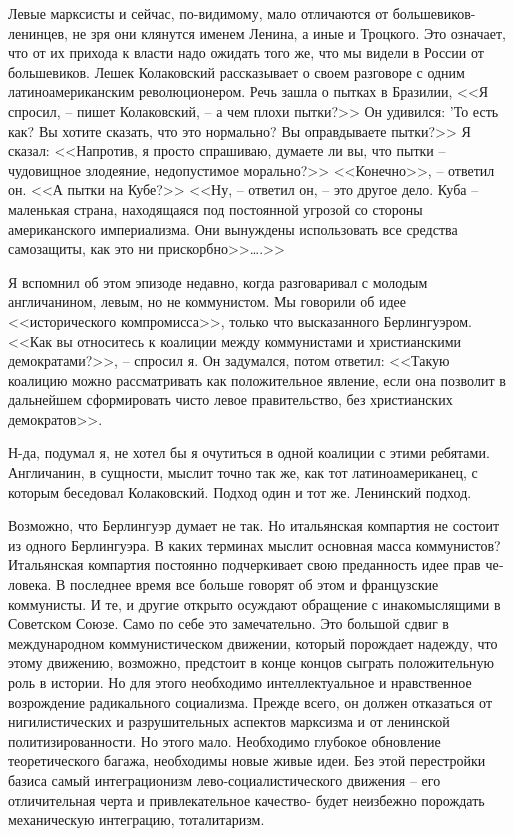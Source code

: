 \documentclass{book}
\begin{document}
Левые марксисты и сейчас, по-видимому, мало отличаются от большевиков-ленинцев, не зря они клянутся именем Ленина, а иные и Троцкого. Это означает, что от их прихода к власти надо ожидать того же, что мы видели в России от большевиков. Лешек Колаковский рассказывает о своем разговоре с одним латиноамериканским революционером. Речь зашла о пытках в Бразилии, <<Я спросил, -- пишет Колаковский, -- а чем плохи пытки?>> Он удивился: 'То есть как? Вы хотите сказать, что это нормально? Вы оправдываете пытки?>> Я сказал: <<Напротив, я просто спрашиваю, думаете ли вы, что пытки -- чудовищное зло­деяние, недопустимое морально?>> <<Конечно>>, -- ответил он. <<А пытки на Кубе?>> <<Ну, -- ответил он, -- это другое дело. Ку­ба -- маленькая страна, находящаяся под постоянной угрозой со стороны американского империализма. Они вынуждены использовать все средства самозащиты, как это ни прискорб­но>>\ldots.>>%

Я вспомнил об этом эпизоде недавно, когда разговаривал с молодым англичанином, левым, но не коммунистом. Мы го­ворили об идее <<исторического компромисса>>, только что вы­сказанного Берлингуэром. <<Как вы относитесь к коалиции меж­ду коммунистами и христианскими демократами?>>, -- спросил я. Он задумался, потом ответил: <<Такую коалицию можно рас­сматривать как положительное явление, если она позволит в дальнейшем сформировать чисто левое правительство, без христианских демократов>>.

Н-да, подумал я, не хотел бы я очутиться в одной коалиции с этими ребятами. Англичанин, в сущности, мыслит точно так же, как тот латиноамериканец, с которым беседовал Колаков­ский. Подход один и тот же. Ленинский подход.

Возможно, что Берлингуэр думает не так. Но итальянская компартия не состоит из одного Берлингуэра. В каких терми­нах мыслит основная масса коммунистов? Итальянская ком­партия постоянно подчеркивает свою преданность идее прав че­ловека. В последнее время все больше говорят об этом и фран­цузские коммунисты. И те, и другие открыто осуждают обра­щение с инакомыслящими в Советском Союзе. Само по себе это замечательно. Это большой сдвиг в международном ком­мунистическом движении, который порождает надежду, что этому движению, возможно, предстоит в конце концов сы­грать положительную роль в истории. Но для этого необходимо интеллектуальное и нравственное возрождение радикального социализма. Прежде всего, он должен отказаться от нигилисти­ческих и разрушительных аспектов марксизма и от ленинской политизированности. Но этого мало. Необходимо глубокое обновление теоретического багажа, необходимы новые живые идеи. Без этой перестройки базиса самый интеграционизм лево-социалистического движения -- его отличительная 
черта и при­влекательное качество- будет неизбежно порождать механиче­скую интеграцию, тоталитаризм.
\end{document}
